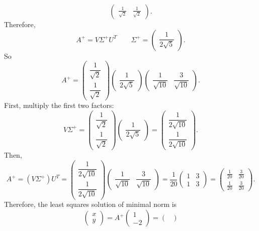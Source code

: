 \documentclass[10pt]{extarticle}
\begin{document}
\begin{enumerate}[label=(\alph*)]
\[\begin{pmatrix}
\frac{1}{\sqrt{2}} & \frac{1}{\sqrt{2}}
\end{pmatrix}.
\]
Therefore,
\[
A^+=V\Sigma^+U^T
\qquad
\Sigma^+=
\begin{pmatrix}
\dfrac{1}{2\sqrt{5}}
\end{pmatrix}.
\]
So
\[
A^+=
\begin{pmatrix}
\dfrac{1}{\sqrt{2}}\\[0.4em]
\dfrac{1}{\sqrt{2}}
\end{pmatrix}
\begin{pmatrix}
\dfrac{1}{2\sqrt{5}}
\end{pmatrix}
\begin{pmatrix}
\dfrac{1}{\sqrt{10}} & \dfrac{3}{\sqrt{10}}
\end{pmatrix}.
\]
First, multiply the first two factors:
\[
V\Sigma^+=
\begin{pmatrix}
\dfrac{1}{\sqrt{2}}\\[0.4em]
\dfrac{1}{\sqrt{2}}
\end{pmatrix}
\begin{pmatrix}
\dfrac{1}{2\sqrt{5}}
\end{pmatrix}
=
\begin{pmatrix}
\dfrac{1}{2\sqrt{10}}\\[0.4em]
\dfrac{1}{2\sqrt{10}}
\end{pmatrix}.
\]
Then,
\[
A^+=(V\Sigma^+)U^T
=
\begin{pmatrix}
\dfrac{1}{2\sqrt{10}}\\[0.4em]
\dfrac{1}{2\sqrt{10}}
\end{pmatrix}
\begin{pmatrix}
\dfrac{1}{\sqrt{10}} & \dfrac{3}{\sqrt{10}}
\end{pmatrix}
=
\frac{1}{20}
\begin{pmatrix}
1 & 3\\[0.4em]
1 & 3
\end{pmatrix}
=
\begin{pmatrix}
\frac{1}{20} & \frac{3}{20}\\[0.4em]
\frac{1}{20} & \frac{3}{20}
\end{pmatrix}.
\]
Therefore, the least squares solution of minimal norm is
\[
\begin{pmatrix}
x\\y
\end{pmatrix}
=
A^+
\begin{pmatrix}
1\\-2
\end{pmatrix}
=
\begin{pmatrix}

\end{pmatrix}\]
\end{enumerate}
\end{document}

